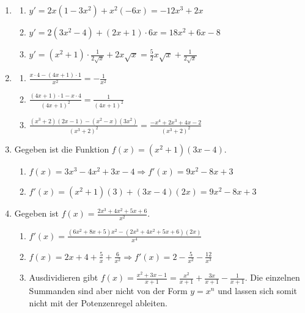 \begin{enumerate}
    \item
          \begin{enumerate}
              \item \( y' = 2x(1 - 3x^2) + x^2(-6x) = -12x^3 +2x\)
              \item \( y' = 2(3x^2-4)+(2x+1)\cdot 6x  = 18x^2 + 6x - 8 \)
              \item \( y' = (x^2+1) \cdot \frac{1}{2\sqrt{x}} + 2x\sqrt{x} = \frac{5}{2} x\sqrt{x} +\frac{1}{2\sqrt{x}}\)
          \end{enumerate}



    \item
          \begin{enumerate}
              \item $\frac{x\cdot 4 - (4x+1)\cdot 1}{x^2} = -\frac{1}{x^2}$
              \item $\frac{(4x+1)\cdot 1 - x\cdot 4}{(4x+1)^2} = \frac{1}{(4x+1)^2}$
              \item $\frac{(x^3+2)(2x-1) - (x^2-x)(3x^2)}{(x^3+2)^2} = \frac{-x^4+2x^3+4x-2}{(x^3+2)^2}$
          \end{enumerate}

    \item Gegeben ist die Funktion \( f(x) = (x^2 + 1)(3x - 4) \).
          \begin{enumerate}
              \item $f(x) = 3x^3 - 4x^2 + 3x - 4 \Rightarrow f'(x) = 9x^2 - 8x + 3$
              \item \( f'(x) = (x^2 + 1)(3) + (3x - 4)(2x) = 9x^2 - 8x + 3 \)
          \end{enumerate}

    \item Gegeben ist \( f(x) = \frac{2x^3+4x^2+5x+6}{x^2} \).
          \begin{enumerate}
              \item \( f'(x) = \frac{(6x^2 + 8x + 5)x^2 - (2x^3 + 4x^2 + 5x + 6)(2x)}{x^4} \)
              \item \( f(x) = 2x + 4 + \frac{5}{x} + \frac{6}{x^2} \Rightarrow f'(x) = 2 - \frac{5}{x^2} - \frac{12}{x^3} \)
              \item Ausdividieren gibt $f(x) = \frac{x^2+3x-1}{x+1} = \frac{x^2}{x+1}+\frac{3x}{x+1}-\frac{1}{x+1}$. Die einzelnen Summanden sind aber nicht von der Form $y=x^n$ und lassen sich somit nicht mit der Potenzenregel ableiten.


\end{enumerate}
\end{enumerate}
